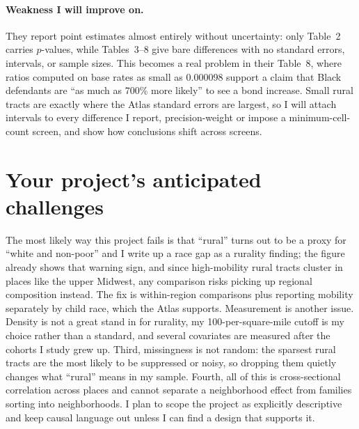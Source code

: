 \documentclass[11pt]{article}
\begin{document}
\paragraph{Weakness I will improve on.} They report point estimates almost entirely
without uncertainty: only Table~2 carries $p$-values, while Tables~3--8 give bare
differences with no standard errors, intervals, or sample sizes. This becomes a real
problem in their Table~8, where ratios computed on base rates as small as 0.000098
support a claim that Black defendants are ``as much as 700\% more likely'' to see a
bond increase. Small rural tracts are exactly where the Atlas standard errors are
largest, so I will attach intervals to every difference I report, precision-weight or
impose a minimum-cell-count screen, and show how conclusions shift across screens.

\section{Your project's anticipated challenges}
\label{sec:premortem}

The most likely way this project fails is that ``rural'' turns out to be a proxy for
``white and non-poor'' and I write up a race gap as a rurality finding; the figure
already shows that warning sign, and since high-mobility rural tracts cluster in
places like the upper Midwest, any comparison risks picking up regional composition
instead. The fix is within-region comparisons plus reporting mobility separately by
child race, which the Atlas supports. Measurement is another issue. Density is not a great stand in for rurality, my 100-per-square-mile cutoff is my choice rather than a
standard, and several covariates are measured after the cohorts I study grew up.
Third, missingness is not random: the sparsest rural tracts are the most likely to
be suppressed or noisy, so dropping them quietly changes what ``rural'' means in my
sample. Fourth, all of this is cross-sectional correlation across places and cannot
separate a neighborhood effect from families sorting into neighborhoods. I plan to
scope the project as explicitly descriptive and keep causal language out unless I can
find a design that supports it.
\end{document}
